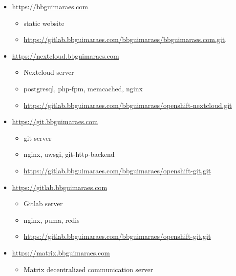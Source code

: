 \begin{itemize}
    \item
        \url{https://bbguimaraes.com}
        \begin{itemize}
            \item static website
            \item \url{https://gitlab.bbguimaraes.com/bbguimaraes/bbguimaraes.com.git}.
        \end{itemize}
    \item
        \url{https://nextcloud.bbguimaraes.com}
        \begin{itemize}
            \item Nextcloud server
            \item postgresql, php-fpm, memcached, nginx
            \item \url{https://gitlab.bbguimaraes.com/bbguimaraes/openshift-nextcloud.git}
        \end{itemize}
    \item
        \url{https://git.bbguimaraes.com}
        \begin{itemize}
            \item git server
            \item nginx, uwsgi, git-http-backend
            \item \url{https://gitlab.bbguimaraes.com/bbguimaraes/openshift-git.git}
        \end{itemize}
    \item
        \url{https://gitlab.bbguimaraes.com}
        \begin{itemize}
            \item Gitlab server
            \item nginx, puma, redis
            \item \url{https://gitlab.bbguimaraes.com/bbguimaraes/openshift-git.git}
        \end{itemize}
    \item
        \url{https://matrix.bbguimaraes.com}
        \begin{itemize}
            \item Matrix decentralized communication server
        \end{itemize}
\end{itemize}
